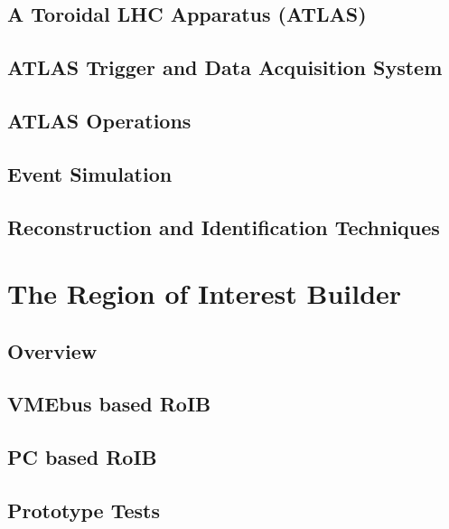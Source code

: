 \documentclass{outhesis}
\begin{document}
\section{A Toroidal LHC Apparatus (ATLAS)}\label{sec:exp.atlas}

\section{ATLAS Trigger and Data Acquisition System}\label{sec:exp.tdaq}

\section{ATLAS Operations}\label{sec:exp.op}

\section{Event Simulation}\label{sec:exp.sim}

\section{Reconstruction and Identification Techniques}\label{sec:exp.reco}


\chapter{The Region of Interest Builder}\label{chap:roib}
\graphicspath{{figures/roib/}}
\section{Overview}\label{sec:roib.overview}

\section{VMEbus based RoIB}\label{sec:roib.overview}

\section{PC based RoIB}\label{sec:roib.pc}

\section{Prototype Tests}\label{sec:roib.proto}

\end{document}
